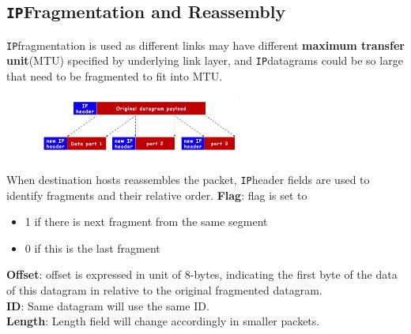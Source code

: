 \documentclass[12pt]{article}
\newcommand\IP{\texttt{IP}}
\theoremstyle{definition}
\begin{document}
\subsection{\IP Fragmentation and Reassembly}
\IP fragmentation is used as different links may have different \textbf{maximum transfer unit}(MTU) specified by underlying link layer, and \IP datagrams could be so large that need to be fragmented to fit into MTU.
\begin{figure}[h]
\centering
\includegraphics[width = 0.6\textwidth]{6_2_1.png}
\end{figure}
When destination hosts reassembles the packet, \IP header fields are used to identify fragments and their relative order.
\textbf{Flag}: flag is set to 
\begin{itemize}
  \item 1 if there is next fragment from the same segment
  \item 0 if this is the last fragment
\end{itemize}
\textbf{Offset}: offset is expressed in unit of 8-bytes, indicating the first byte of the data of this datagram in relative to the original fragmented datagram.\\
\textbf{ID}: Same datagram will use the same ID.\\
\textbf{Length}: Length field will change accordingly in smaller packets.
\end{document}
